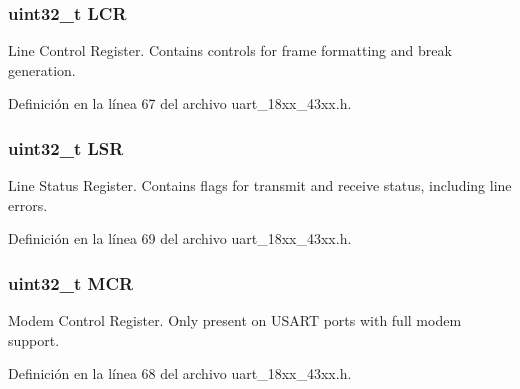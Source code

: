 \subsubsection[{\texorpdfstring{L\+CR}{LCR}}]{ uint32\+\_\+t L\+CR}\hypertarget{struct_l_p_c___u_s_a_r_t___t_a982bb8011be2ffc1dd0d4379012b816e}{}\label{struct_l_p_c___u_s_a_r_t___t_a982bb8011be2ffc1dd0d4379012b816e}
Line Control Register. Contains controls for frame formatting and break generation. 

Definición en la línea 67 del archivo uart\+\_\+18xx\+\_\+43xx.\+h.

\subsubsection[{\texorpdfstring{L\+SR}{LSR}}]{ uint32\+\_\+t L\+SR}\hypertarget{struct_l_p_c___u_s_a_r_t___t_a8387dc0dc9f45c8a81cfc98bfff7ae32}{}\label{struct_l_p_c___u_s_a_r_t___t_a8387dc0dc9f45c8a81cfc98bfff7ae32}
Line Status Register. Contains flags for transmit and receive status, including line errors. 

Definición en la línea 69 del archivo uart\+\_\+18xx\+\_\+43xx.\+h.

\subsubsection[{\texorpdfstring{M\+CR}{MCR}}]{ uint32\+\_\+t M\+CR}\hypertarget{struct_l_p_c___u_s_a_r_t___t_a27af4e9f888f0b7b1e8da7e002d98798}{}\label{struct_l_p_c___u_s_a_r_t___t_a27af4e9f888f0b7b1e8da7e002d98798}
Modem Control Register. Only present on U\+S\+A\+RT ports with full modem support. 

Definición en la línea 68 del archivo uart\+\_\+18xx\+\_\+43xx.\+h.

